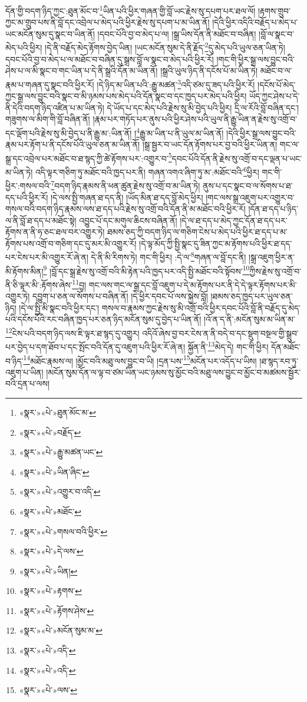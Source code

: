 དོན་གྱི་བདག་ཉིད་ཀྱང་:ཐུན་མོང་བ་\footnote{«སྣར་»«པེ་»ཐུན་མོང་མ་}ཡིན་པའི་ཕྱིར་གཞན་གྱི་བློ་ཡང་རྗེས་སུ་དཔག་པར་ཐལ་ལོ། །རྟགས་གྲུབ་ཀྱང་མ་གྲུབ་པས་ནི་བློ་དང་འབྲེལ་པ་མེད་པའི་ཕྱིར་རྗེས་སུ་དཔག་པ་མ་ཡིན་ནོ། །དེའི་ཕྱིར་འདིའི་བརྗོད་པ་མེད་པ་ཡང་མངོན་སུམ་དུ་སྣང་བ་ཡིན་ནོ། །དབང་པོའི་བྱ་བ་མེད་པ་ལ། །སྒྲ་ཡིས་དོན་ནི་མཐོང་བ་བཞིན། །བློ་ལ་སྣང་བ་མེད་པའི་ཕྱིར། །དེ་ནི་བརྗོད་མེད་རྟོགས་བྱེད་ཡིན། །ཡང་མངོན་སུམ་དེ་ནི་རྗོད་\footnote{«སྣར་»«པེ་»བརྗོད་}དུ་མེད་པའི་ཡུལ་ཅན་ཡིན་ཏེ། དབང་པོའི་བྱ་བ་མེད་པ་ལ་མཐོང་བ་བཞིན་དུ་སྒྲས་བློ་ལ་སྣང་བ་མེད་པའི་ཕྱིར་རོ། །གང་གི་ཕྱིར་སྒྲ་ལས་བྱུང་བའི་ཤེས་པ་ལ་མི་སྣང་བ་གང་ཡིན་པ་དེ་ནི་སྒྲའི་དོན་མ་ཡིན་ནོ། །སྒྲའི་ཡུལ་ཉིད་ནི་དངོས་པོ་མ་ཡིན་ཏེ། མཐོང་བ་ལ་རྣམ་པ་གཞན་དུ་སྣང་བའི་ཕྱིར་རོ། །དེ་ཉིད་མ་ཡིན་པའི་:རྒྱུ་མཚན་\footnote{«སྣར་»«པེ་»རྒྱུ་མཚན་ཡང་}འདི་ཙམ་དུ་ཟད་པའི་ཕྱིར་རོ། །དངོས་པོ་མེད་ཀྱང་སྒྲ་ལས་བྱུང་བའི་སྣང་བ་མི་ཉམས་པས་མེད་པའི་དོན་སྣང་བ་དང་ཁྱད་པར་མེད་པའི་ཕྱིར། ཡོད་ཀྱང་ཤེས་པ་དེ་ནི་དེའི་བདག་ཉིད་འཛིན་པ་མ་ཡིན་ཏེ། དེ་ཡོད་པ་དང་མེད་པའི་རྗེས་སུ་མི་བྱེད་པའི་ཕྱིར། དྲི་ལ་རོའི་བློ་བཞིན་དང་། གཟུགས་ལ་མིག་གི་བློ་བཞིན་ནོ། །རྣམ་པར་གཏོད་པར་ནུས་པའི་ཕྱིར་ཤེས་པའི་ཡུལ་ནི་རྒྱུ་ཡིན་ན་རྗེས་སུ་འགྲོ་བ་དང་ལྡོག་པའི་རྗེས་སུ་མི་བྱེད་པ་ནི་རྒྱུ་མ་:ཡིན་ནོ། །\footnote{«སྣར་»«པེ་»ཡིན་ཞིང་}རྒྱུ་མ་ཡིན་པ་ནི་ཡུལ་མ་ཡིན་ནོ། །དེའི་ཕྱིར་སྒྲ་ལས་བྱུང་བའི་རྣམ་པར་རྟོག་པ་ནི་དངོས་པོའི་ཡུལ་ཅན་མ་ཡིན་ནོ། །སྒྲ་སྦྱར་བ་ཡང་དོན་རྟོགས་པར་བྱ་བའི་ཕྱིར་ཡིན་ན། གང་ལ་སྒྲ་དང་འབྲེལ་པར་མཐོང་བ་ཐ་སྙད་ཀྱི་ཚེ་རྟོགས་པར་:འགྱུར་བ་\footnote{«སྣར་»«པེ་»འགྱུར་བ་འདི་}དབང་པོའི་དོན་ནི་རྗེས་སུ་འགྲོ་བ་དང་ལྡན་པ་ཡང་མ་ཡིན་ཏེ། འདི་ལྟར་གཅིག་ཏུ་མཐོང་བའི་ཁྱད་པར་ནི། གཞན་འགའ་ཞིག་ཏུ་མ་:མཐོང་བའི་\footnote{«སྣར་»«པེ་»མཐོང་}ཕྱིར། གང་གི་ཕྱིར་:གསལ་བའི་\footnote{«སྣར་»«པེ་»གསལ་བའི་ཕྱིར་}བདག་ཉིད་རྣམས་ནི་ཕན་ཚུན་རྗེས་སུ་འགྲོ་བ་མ་ཡིན་ཏེ། ནུས་པ་དང་སྣང་བ་ལ་སོགས་པ་ཐ་དད་པའི་ཕྱིར་རོ། །དེ་ལས་སྤྱི་གཞན་ཐ་དད་ནི། །ཡོད་མིན་ཐ་དད་བློ་མེད་ཕྱིར། །གང་ལས་སྒྲ་འཇུག་པར་འགྱུར་བ་གསལ་བའི་བདག་ཉིད་རྣམས་ལས་ཐ་དད་པའི་རྗེས་སུ་འགྲོ་བའི་དོན་ནི་མ་མཐོང་བའི་ཕྱིར་རོ། །དོན་ཐ་དད་པ་ཉིད་ལ་ནི་བློ་ཐ་དད་པ་མཐོང་སྟེ། འབྱུང་པོ་དང་མགུལ་ཆིངས་བཞིན་ནོ། །དེ་ལ་ཐ་དད་པ་མེད་ཀྱང་དོན་ཐ་དད་པར་རྟོགས་ན་ནི་ཧ་ཅང་ཐལ་བར་འགྱུར་ཏེ། ཐམས་ཅད་ཀྱི་བདག་ཉིད་ལ་གཅིག་ངེས་པ་མེད་པའི་ཕྱིར་ཐ་དད་པ་མ་རྟོགས་པས་འགྲོ་བ་གཅིག་དང་དུ་མར་མི་འགྱུར་རོ། །དེ་ལྟ་མོད་ཀྱི་སྤྱི་སྣང་དུ་ཟིན་ཀྱང་མ་རྟོགས་པའི་ཕྱིར་ཐ་དད་པར་ངེས་པར་མི་འགྱུར་རོ་ཞེ་ན། དེ་ནི་མི་རིགས་ཏེ། གང་གི་ཕྱིར། :དེ་ལ་\footnote{«སྣར་»«པེ་»དེ་ལས་}གཞན་ལ་བློ་དང་ནི། །སྒྲ་འཇུག་ཕྱིར་ན་མི་རྟོགས་མིན།\footnote{«སྣར་»«པེ་»ཡིན།} །བློ་དང་སྒྲ་རྗེས་སུ་འགྲོ་བའི་མི་རྟེན་པའི་ཁྱད་པར་འདི་སྤྱི་མཐོང་བའི་སྟོབས་\footnote{«སྣར་»«པེ་»རྟགས་}ཀྱིས་རྗེས་སུ་འགྲོ་བ་ནི་ཅི་ལྟར་མི་:རྟོགས་ཞེས་\footnote{«སྣར་»«པེ་»རྟོགས་ཤེས་}བྱ། གང་ལས་གང་ལ་སྒྲ་དང་བློ་འཇུག་པ་དེ་མ་རྟོགས་པར་ནི་དེ་དེ་ལྟར་རྟོགས་པར་མི་འགྱུར་ཏེ། དབྱུག་པ་ཅན་ལ་སོགས་པ་བཞིན་ནོ། །དེ་ཕྱིར་དབང་པོ་ལས་སྐྱེས་བློ། །ཐམས་ཅད་ཁྱད་པར་ཡུལ་ཅན་ཉིད། །དེ་ལ་སྤྱི་མི་སྣང་བའི་ཕྱིར་དང་། གསལ་བ་རྣམས་ཀྱང་རྗེས་སུ་མི་འགྲོ་བའི་ཕྱིར་དབང་པོའི་བློ་ནི་བརྗོད་དུ་མེད་པའི་དངོས་པོའི་རང་བཞིན་ཁྱད་པར་ཅན་ཉིད་མངོན་སུམ་དུ་བྱེད་པ་ཡིན་ནོ། །འོ་ན་ད་ནི་:མངོན་སུམ་མ་ཡིན་མ་\footnote{«སྣར་»«པེ་»མངོན་སུམ་མ་}ངེས་པའི་བདག་ཉིད་ལས་ཇི་ལྟར་ཐ་སྙད་དུ་འགྱུར། འདིའོ་ཞེས་བྱ་བར་ངེས་ན་ནི་བདེ་བ་དང་སྡུག་བསྔལ་གྱི་སྒྲུབ་པར་བྱེད་པ་དག་ཐོབ་པ་དང་སྤོང་བའི་དོན་དུ་འཇུག་པའི་ཕྱིར་རོ་ཞེ་ན། སྐྱོན་ནི་\footnote{«སྣར་»«པེ་»འདི་}མེད་དེ། གང་གི་ཕྱིར། དོན་མཐོང་བ་ཉིད་\footnote{«སྣར་»«པེ་»འདི་}མཐོང་རྣམས་ལ། །མྱོང་བའི་མཐུ་ལས་བྱུང་བ་ཡི། །དྲན་པས་\footnote{«སྣར་»«པེ་»ལས་}མངོན་པར་འདོད་པ་ཡིས། །ཐ་སྙད་རབ་ཏུ་འཇུག་པ་ཡིན། །མངོན་སུམ་དོན་ལ་ལྟ་བ་ཙམ་ཡིན་ཡང་ཉམས་སུ་མྱོང་བའི་མཐུ་ལས་བྱུང་བ་མྱོང་བ་མཚམས་སྦྱོར་བའི་དྲན་པ་ལས། 